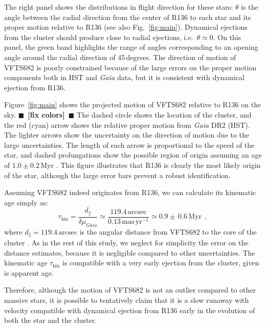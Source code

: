 \documentclass[apjl,twocolumn]{emulateapj}
\newcommand{\todo}[1]{{\large $\blacksquare$~\textbf{\color{red}[#1]}}~$\blacksquare$}
\newcommand{\masyr}{\,\mathrm{mas}\,\mathrm{yr}^{-1}}
\DeclareRobustCommand{\Figref}[1]{Fig.~\ref{#1}}
\begin{document}
The right panel shows the distributions in flight direction for these
stars: $\theta$ is the angle between the radial direction from the
center of R136 to each star and its proper motion relative to
R136 (see also \Figref{fig:main}). Dynamical ejections from the
cluster should %
produce
close to radial ejections, i.e.~$\theta\simeq0$. On this panel, the green band highlights
the range of angles corresponding to an opening angle around the
radial direction of 45\,degrees. The direction of motion of VFTS682 is
poorly constrained because of the large errors on the proper motion
components both in HST and \emph{Gaia} data, but
it is consistent with dynamical ejection from R136.

Figure~\ref{fig:main} shows the projected motion of VFTS682 relative to R136 on the
sky. \todo{fix colors} The dashed circle shows the location of the cluster, and the red
(cyan) arrow shows the relative proper motion from \emph{Gaia} DR2
(HST). The lighter arrows show the uncertainty on the direction of
motion due to the large uncertainties. The length of each arrow is proportional to
the speed of the star, and dashed prolungations show the possible
region of origin assuming an age of $1.0\pm0.2$\,Myr
\citep[][]{schneider:18}. This figure illustrates that R136 is clearly
the most likely origin of the star, although the large error bars
prevent a robust identification. 

Assuming VFTS682 indeed originates from R136, we can calculate its kinematic
age simply as:
\begin{equation}
  \label{eq:kin_age}
  \tau_\mathrm{kin} = \frac{d_\parallel}{\delta\mu_{Gaia}} \simeq
  \frac{119.4\,\mathrm{arcsec}}{0.13\masyr} \simeq 0.9\pm\,0.6\, \mathrm{Myr} \ \ ,
\end{equation}
where $d_\parallel = 119.4\,\mathrm{arcsec}$ is the angular distance from VFTS682 to
the core of the cluster \citep[corresponding to $\sim$29\,pc at LMC distance,][]{bestenlehner:11}.
As in the rest of this study, we neglect for
simplicity the error on the distance estimates, because it is negligible compared to other uncertainties.
The kinematic age $\tau_\mathrm{kin}$ is compatible with a very early
ejection from the cluster, given is apparent age.

Therefore, although the motion of VFTS682 is not an outlier compared
to other massive stars, it is possible to tentatively claim that it is
a slow runaway with velocity compatible with dynamical ejection from
R136 early in the evolution of both the star and the cluster. 
\end{document}

